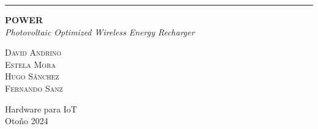 
\begin{titlepage}
    \raggedleft
    \rule{1pt}{\textheight}
    \hspace{0.05\textwidth}
    \parbox[b]{0.9\textwidth}{
            {\Huge\bfseries POWER}\\[\baselineskip] %
            {\Large\textit{Photovoltaic Optimized Wireless Energy Recharger}}\\[7\baselineskip] %
        \vspace{0.45\textheight}
        
        {\Large\textsc{David Andrino}}\\[0.5\baselineskip]
        {\Large\textsc{Estela Mora}}\\[0.5\baselineskip]
        {\Large\textsc{Hugo Sánchez}}\\[0.5\baselineskip]
        {\Large\textsc{Fernando Sanz}}\\
        \vspace{0.05\textheight}
        
        {\noindent\large Hardware para IoT}\\
        {\noindent\large Otoño 2024}\\
    }

\end{titlepage}